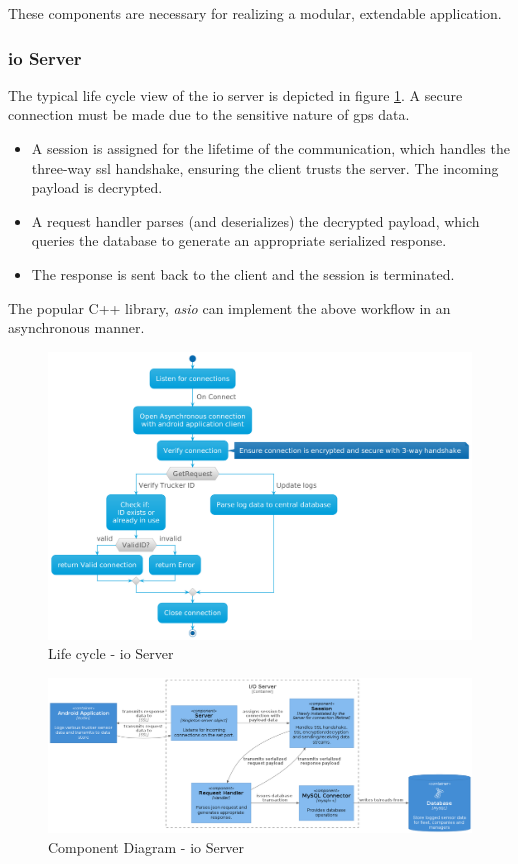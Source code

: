These components are necessary for realizing a modular, extendable application.

\pagebreak
\subsubsection{\Ac{io} Server}
The typical life cycle view of the \ac{io} server is depicted in figure \ref{fig:IO_activity}.
A secure connection must be made due to the sensitive nature of \ac{gps} data.
\begin{itemize}
\item A session is assigned for the lifetime of the communication, which handles the three-way \ac{ssl} handshake, ensuring the client trusts the server. The incoming payload is decrypted.
\item A request handler parses (and deserializes) the decrypted payload, which queries the database to generate an appropriate serialized response.
\item The response is sent back to the client and the session is terminated.
\end{itemize}

The popular C++ library, \textit{asio} can implement the above workflow in an asynchronous manner.

\begin{figure}
\centering
\includegraphics[width=6in]{../diag/IO_activity.png}
\caption{Life cycle - \Ac{io} Server}
\label{fig:IO_activity}
\end{figure}

\begin{figure}[H]
\centering
\includegraphics[width=6in]{../diag/IO_component.png}
\caption{Component Diagram - \Ac{io} Server}
\label{fig:IO_component}
\end{figure}

